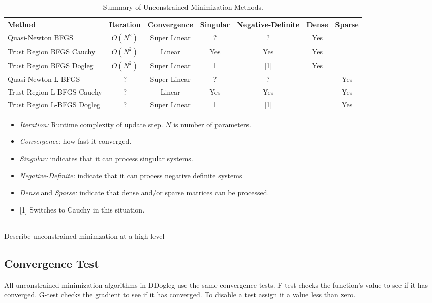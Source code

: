 \documentclass[peerreview,onecolumn]{IEEEtran}
\begin{document}
\begin{table}[h]
\caption{\label{summary:UM}Summary of Unconstrained Minimization Methods.}
\centering
\begin{tabular}{lcccccc}
Method & Iteration & Convergence & Singular & Negative-Definite & Dense & Sparse \\[1ex]
\hline
Quasi-Newton BFGS & $O(N^2)$ & Super Linear & ? & ? & Yes &  \rule{0pt}{2.6ex} \\
Trust Region BFGS Cauchy & $O(N^2)$ & Linear & Yes & Yes & Yes &  \\
Trust Region BFGS Dogleg & $O(N^2)$ & Super Linear & [1] & [1] & Yes &  \\
Quasi-Newton L-BFGS & ? & Super Linear & ? & ? &   & Yes \\
Trust Region L-BFGS Cauchy & ? &  Linear & Yes & Yes &  & Yes \\
Trust Region L-BFGS Dogleg & ? &  Super Linear & [1] & [1] &  & Yes \\[1ex]
\hline
\multicolumn{6}{l}{
\begin{minipage}{0.6\textwidth}
\centering
\vspace{2mm}
\begin{itemize}[leftmargin=*]
\item \emph{Iteration:} Runtime complexity of update step. $N$ is number of parameters.
\item \emph{Convergence:} how fast it converged.
\item \emph{Singular:} indicates that it can process singular systems.
\item \emph{Negative-Definite:} indicate that it can process negative definite systems
\item \emph{Dense} and \emph{Sparse:} indicate that dense and/or sparse matrices can be processed. 
\item {[1]} Switches to Cauchy in this situation.
\end{itemize}
\end{minipage}
 }
\end{tabular}
\end{table}

Describe unconstrained minimzation at a high level


\subsection{Convergence Test}

All unconstrained minimization algorithms in DDogleg use the same convergence tests. F-test checks the function's value to see if it has converged. G-test checks the gradient to see if it has converged. To disable a test assign it a value less than zero.
\end{document}
